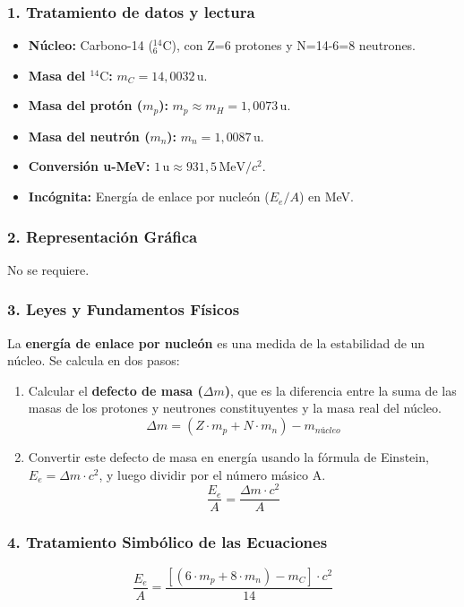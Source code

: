 \subsubsection*{1. Tratamiento de datos y lectura}
\begin{itemize}
    \item \textbf{Núcleo:} Carbono-14 (${}^{14}_6\text{C}$), con Z=6 protones y N=14-6=8 neutrones.
    \item \textbf{Masa del ${}^{14}\text{C}$:} $m_C = 14,0032 \, \text{u}$.
    \item \textbf{Masa del protón ($m_p$):} $m_p \approx m_H = 1,0073 \, \text{u}$.
    \item \textbf{Masa del neutrón ($m_n$):} $m_n = 1,0087 \, \text{u}$.
    \item \textbf{Conversión u-MeV:} $1 \, \text{u} \approx 931,5 \, \text{MeV}/c^2$.
    \item \textbf{Incógnita:} Energía de enlace por nucleón ($E_e/A$) en MeV.
\end{itemize}

\subsubsection*{2. Representación Gráfica}
No se requiere.

\subsubsection*{3. Leyes y Fundamentos Físicos}
La \textbf{energía de enlace por nucleón} es una medida de la estabilidad de un núcleo. Se calcula en dos pasos:
\begin{enumerate}
    \item Calcular el \textbf{defecto de masa ($\Delta m$)}, que es la diferencia entre la suma de las masas de los protones y neutrones constituyentes y la masa real del núcleo.
    $$\Delta m = (Z \cdot m_p + N \cdot m_n) - m_{núcleo}$$
    \item Convertir este defecto de masa en energía usando la fórmula de Einstein, $E_e = \Delta m \cdot c^2$, y luego dividir por el número másico A.
    $$\frac{E_e}{A} = \frac{\Delta m \cdot c^2}{A}$$
\end{enumerate}

\subsubsection*{4. Tratamiento Simbólico de las Ecuaciones}
$$\frac{E_e}{A} = \frac{[(6 \cdot m_p + 8 \cdot m_n) - m_C] \cdot c^2}{14}$$

